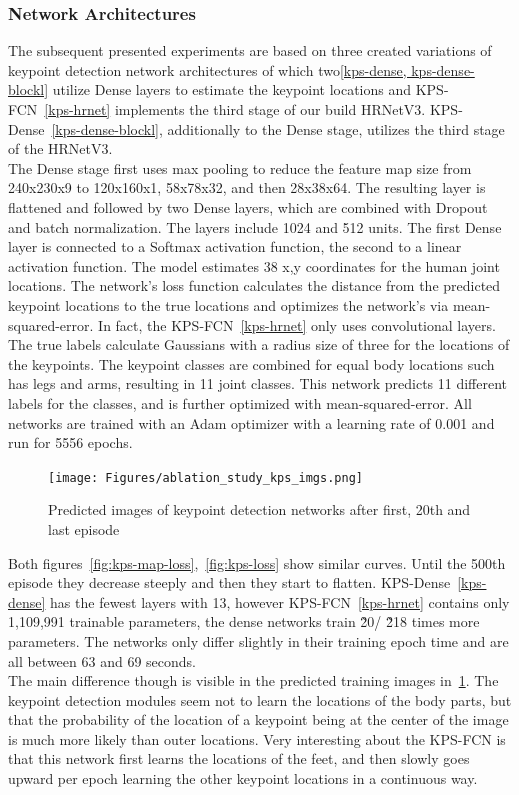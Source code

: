 \subsubsection{Network Architectures}
The subsequent presented experiments are based on
three created variations of keypoint detection network architectures of which two\ref{kps-dense, kps-dense-blockl}
utilize Dense layers to estimate the keypoint locations and KPS-FCN~\ref{kps-hrnet} implements the third stage of our
build HRNetV3.
KPS-Dense~\ref{kps-dense-blockl}, additionally to the Dense stage, utilizes the third stage of the HRNetV3.\\
The Dense stage first uses max pooling to reduce the feature map size from 240x230x9 to 120x160x1, 58x78x32, and then 28x38x64.
The resulting  layer is flattened and followed by two Dense layers, which are combined with Dropout and
batch normalization.
The layers include 1024 and 512 units.
The first Dense layer is connected to a Softmax activation function,
the second to a linear activation function. The model estimates 38 x,y coordinates for the human joint locations.
The network's loss function calculates the distance from the predicted keypoint locations to the true locations and optimizes
the network's via mean-squared-error.
In fact, the KPS-FCN~\ref{kps-hrnet} only uses convolutional layers.
The true labels calculate Gaussians with a radius size of three for the locations of the keypoints.
The keypoint classes are combined for equal body locations such has legs and arms, resulting in 11 joint classes.
This network predicts 11 different labels for the classes, and is further optimized with mean-squared-error.
%
All networks are trained with an Adam optimizer with a learning rate of 0.001 and run for 5556 epochs.
%
\begin{figure}[H]
    \centering
    \texttt{[image: Figures/ablation\_study\_kps\_imgs.png]}
    \decoRule
    \caption[Ablation Keypoints Detection Module: Predicted Training Images]{Predicted images of keypoint detection networks
    after first, 20th and last episode}
    \label{fig:kps-train-imgs}
\end{figure}
%
Both figures~\ref{fig:kps-map-loss},~\ref{fig:kps-loss} show similar curves.
Until the 500th episode they decrease steeply and then they start to flatten.
KPS-Dense~\ref{kps-dense} has the fewest layers with 13, however KPS-FCN~\ref{kps-hrnet} contains only 1,109,991
trainable parameters, the dense networks train \~20/ \~218 times more parameters.
The networks only differ slightly in their training epoch time and are all between 63 and 69 seconds.\\
The main difference though is visible in the predicted training images in~\ref{fig:kps-train-imgs}.
The keypoint detection modules seem not to learn the locations of the body parts, but that the probability of the location
of a keypoint being at the center of the image is much more likely than outer locations.
Very interesting about the KPS-FCN is that this network first learns the locations of the feet, and then slowly goes
upward per epoch learning the other keypoint locations in a continuous way.


